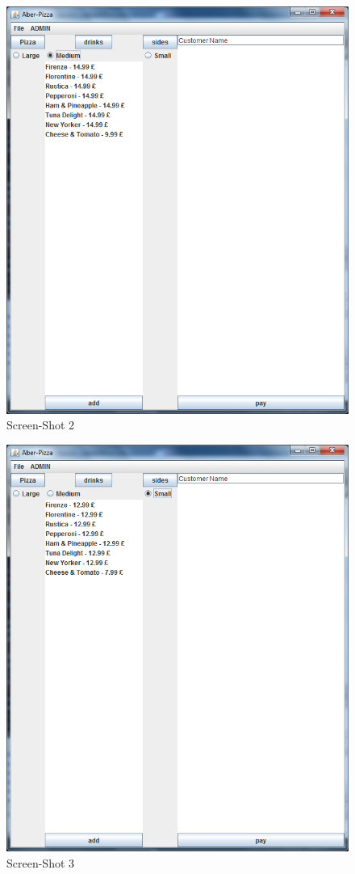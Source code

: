 \documentclass[11pt,a4paper]{article}
\begin{document}
\begin{flushleft}
 \begin{figure}[ht]
	\centering
 	\includegraphics[scale = 0.4]{../Sceenshots/Capture1.PNG} 
	\caption{Screen-Shot 2}
\end{figure}

\begin{figure}[ht]
	\centering
 	\includegraphics[scale = 0.4]{../Sceenshots/Capture2.PNG} 
	\caption{Screen-Shot 3}
\end{figure}


\end{flushleft}
\end{document}
